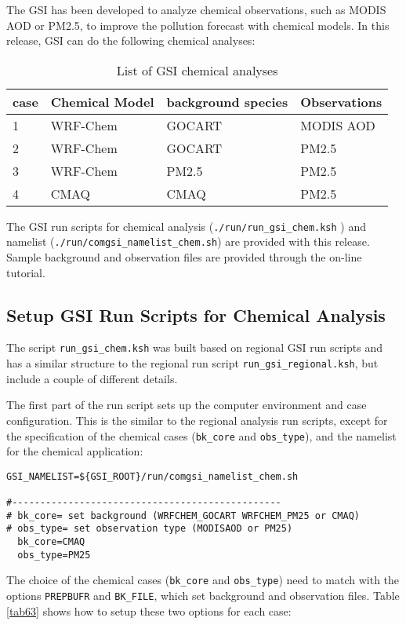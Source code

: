 The GSI has been developed to analyze chemical observations, such as MODIS AOD or PM2.5, to improve the pollution forecast with chemical models. 
In this release, GSI can do the following chemical analyses:

\begin{table}[htbp]
\centering
\caption{List of GSI chemical analyses}
\begin{tabular}{|p{1cm}|p{3cm}|p{4cm}|p{3cm}|}
\hline
case&Chemical Model &background species & Observations\\
\hline
1&WRF-Chem &  GOCART & MODIS AOD \\
\hline
2&WRF-Chem &  GOCART & PM2.5 \\
\hline
3&WRF-Chem &  PM2.5 & PM2.5 \\
\hline
4&CMAQ &  CMAQ & PM2.5 \\
\hline
\end{tabular}
\label{tab62}
\end{table} 

The GSI run scripts for chemical analysis (\verb|./run/run_gsi_chem.ksh| ) and namelist (\verb|./run/comgsi_namelist_chem.sh|) are provided with this release. 
Sample background and observation files are provided through the on-line tutorial. 

\subsection{Setup GSI Run Scripts for Chemical Analysis}

The script \verb|run_gsi_chem.ksh| was built based on regional GSI run scripts and has a similar structure to the regional run script \verb|run_gsi_regional.ksh|, 
but include a couple of different details.

The first part of the run script sets up the computer environment and case configuration. This is the similar to the regional analysis run scripts, except 
for the specification of the chemical cases (\verb|bk_core| and \verb|obs_type|), and the namelist for the chemical application:
\begin{scriptsize}
\begin{verbatim}
GSI_NAMELIST=${GSI_ROOT}/run/comgsi_namelist_chem.sh

#------------------------------------------------
# bk_core= set background (WRFCHEM_GOCART WRFCHEM_PM25 or CMAQ)
# obs_type= set observation type (MODISAOD or PM25)
  bk_core=CMAQ
  obs_type=PM25
\end{verbatim}
\end{scriptsize}
The choice of the chemical cases (\verb|bk_core| and \verb|obs_type|) need to match with the options \verb|PREPBUFR| and \verb|BK_FILE|, which 
set background and observation files. Table \ref{tab63} shows how to setup these two options for each case:

